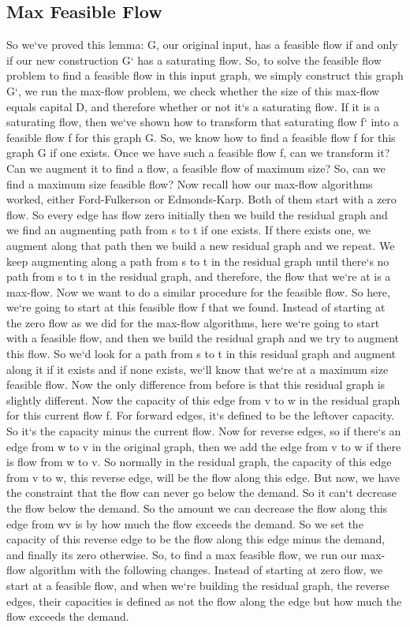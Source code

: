 \subsection{Max Feasible Flow}
So we`ve proved this lemma: G, our original input, has a feasible flow if and only if our new construction G` has a saturating flow.
So, to solve the feasible flow problem to find a feasible flow in this input graph, we simply construct this graph G`, we run the max-flow problem, we check whether the size of this max-flow equals capital D, and therefore whether or not it`s a saturating flow.
If it is a saturating flow, then we`ve shown how to transform that saturating flow f` into a feasible flow f for this graph G\@.
So, we know how to find a feasible flow f for this graph G if one exists.
Once we have such a feasible flow f, can we transform it? Can we augment it to find a flow, a feasible flow of maximum size? So, can we find a maximum size feasible flow? Now recall how our max-flow algorithms worked, either Ford-Fulkerson or Edmonds-Karp.
Both of them start with a zero flow.
So every edge has flow zero initially then we build the residual graph and we find an augmenting path from s to t if one exists.
If there exists one, we augment along that path then we build a new residual graph and we repeat.
We keep augmenting along a path from s to t in the residual graph until there`s no path from s to t in the residual graph, and therefore, the flow that we`re at is a max-flow.
Now we want to do a similar procedure for the feasible flow.
So here, we`re going to start at this feasible flow f that we found.
Instead of starting at the zero flow as we did for the max-flow algorithms, here we`re going to start with a feasible flow, and then we build the residual graph and we try to augment this flow.
So we`d look for a path from s to t in this residual graph and augment along it if it exists and if none exists, we`ll know that we`re at a maximum size feasible flow.
Now the only difference from before is that this residual graph is slightly different.
Now the capacity of this edge from v to w in the residual graph for this current flow f.
For forward edges, it`s defined to be the leftover capacity.
So it`s the capacity minus the current flow.
Now for reverse edges, so if there`s an edge from w to v in the original graph, then we add the edge from v to w if there is flow from w to v.
So normally in the residual graph, the capacity of this edge from v to w, this reverse edge, will be the flow along this edge.
But now, we have the constraint that the flow can never go below the demand.
So it can`t decrease the flow below the demand.
So the amount we can decrease the flow along this edge from wv is by how much the flow exceeds the demand.
So we set the capacity of this reverse edge to be the flow along this edge minus the demand, and finally its zero otherwise.
So, to find a max feasible flow, we run our max-flow algorithm with the following changes.
Instead of starting at zero flow, we start at a feasible flow, and when we`re building the residual graph, the reverse edges, their capacities is defined as not the flow along the edge but how much the flow exceeds the demand.

